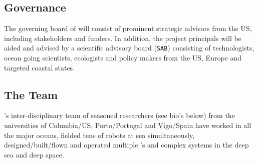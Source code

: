 \documentclass[12pt]{article}
\begin{document}



\subsection{Governance}

The governing board of \pro will consist of prominent strategic
advisors from the US, including stakeholders and funders. In addition,
the project principals will be aided and advised by a scientific
advisory board (\texttt{SAB}) consisting of technologists, ocean going
scientists, ecologists and policy makers from the US, Europe and
targeted coastal states.

\subsection{The Team}

\proe’s inter-disciplinary team of seasoned researchers (see bio's
below) from the universities of Columbia/US, Porto/Portugal and
Vigo/Spain have worked in all the major oceans, fielded tens of robots
at sea simultaneously, designed/built/flown and operated multiple
\smle's and complex systems in the deep sea and deep space.
\end{document}
